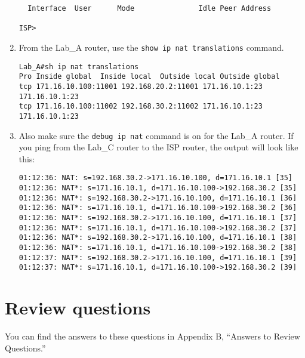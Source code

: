 \begin{enumerate}
\begin{verbatim}
  Interface  User      Mode               Idle Peer Address
 
ISP>
\end{verbatim}
\item
  From the Lab\_A router, use the \texttt{show\ ip\ nat\ translations}
  command.

\begin{verbatim}
Lab_A#sh ip nat translations
Pro Inside global  Inside local  Outside local Outside global
tcp 171.16.10.100:11001 192.168.20.2:11001 171.16.10.1:23    
171.16.10.1:23
tcp 171.16.10.100:11002 192.168.30.2:11002 171.16.10.1:23    
171.16.10.1:23
\end{verbatim}
\item
  Also make sure the \texttt{debug\ ip\ nat} command is on for the
  Lab\_A router. If you ping from the Lab\_C router to the ISP router,
  the output will look like this:

\begin{verbatim}
01:12:36: NAT: s=192.168.30.2->171.16.10.100, d=171.16.10.1 [35]
01:12:36: NAT*: s=171.16.10.1, d=171.16.10.100->192.168.30.2 [35]
01:12:36: NAT*: s=192.168.30.2->171.16.10.100, d=171.16.10.1 [36]
01:12:36: NAT*: s=171.16.10.1, d=171.16.10.100->192.168.30.2 [36]
01:12:36: NAT*: s=192.168.30.2->171.16.10.100, d=171.16.10.1 [37]
01:12:36: NAT*: s=171.16.10.1, d=171.16.10.100->192.168.30.2 [37]
01:12:36: NAT*: s=192.168.30.2->171.16.10.100, d=171.16.10.1 [38]
01:12:36: NAT*: s=171.16.10.1, d=171.16.10.100->192.168.30.2 [38]
01:12:37: NAT*: s=192.168.30.2->171.16.10.100, d=171.16.10.1 [39]
01:12:37: NAT*: s=171.16.10.1, d=171.16.10.100->192.168.30.2 [39]
\end{verbatim}
\end{enumerate}



\section{Review questions}

You can find the answers to these questions in Appendix B, ``Answers to
Review Questions.''


